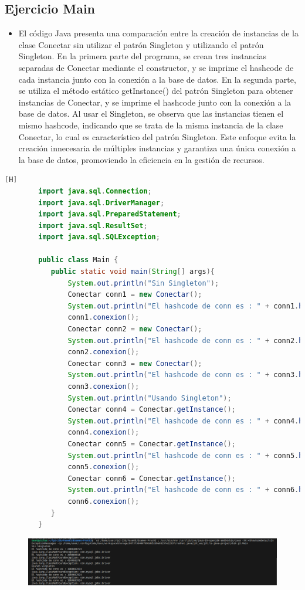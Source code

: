 \documentclass{article}
\begin{document}
	\subsection{Ejercicio Main}
	\begin{itemize}	
		\item El código Java presenta una comparación entre la creación de instancias de la clase Conectar sin utilizar el patrón Singleton y utilizando el patrón Singleton. En la primera parte del programa, se crean tres instancias separadas de Conectar mediante el constructor, y se imprime el hashcode de cada instancia junto con la conexión a la base de datos. En la segunda parte, se utiliza el método estático getInstance() del patrón Singleton para obtener instancias de Conectar, y se imprime el hashcode junto con la conexión a la base de datos. Al usar el Singleton, se observa que las instancias tienen el mismo hashcode, indicando que se trata de la misma instancia de la clase Conectar, lo cual es característico del patrón Singleton. Este enfoque evita la creación innecesaria de múltiples instancias y garantiza una única conexión a la base de datos, promoviendo la eficiencia en la gestión de recursos.
	\end{itemize}	
	\begin{lstlisting}[language=java,caption={Las lineas de codigos del metodo creado:}][H]
		import java.sql.Connection;
		import java.sql.DriverManager;
		import java.sql.PreparedStatement;
		import java.sql.ResultSet;
		import java.sql.SQLException;
		
		public class Main {
		   public static void main(String[] args){
			   System.out.println("Sin Singleton");
			   Conectar conn1 = new Conectar();
			   System.out.println("El hashcode de conn es : " + conn1.hashCode());
			   conn1.conexion();
			   Conectar conn2 = new Conectar();
			   System.out.println("El hashcode de conn es : " + conn2.hashCode());
			   conn2.conexion();
			   Conectar conn3 = new Conectar();
			   System.out.println("El hashcode de conn es : " + conn3.hashCode());
			   conn3.conexion();
			   System.out.println("Usando Singleton");
			   Conectar conn4 = Conectar.getInstance();
			   System.out.println("El hashcode de conn es : " + conn4.hashCode());
			   conn4.conexion();
			   Conectar conn5 = Conectar.getInstance();
			   System.out.println("El hashcode de conn es : " + conn5.hashCode());
			   conn5.conexion();
			   Conectar conn6 = Conectar.getInstance();
			   System.out.println("El hashcode de conn es : " + conn6.hashCode());
			   conn6.conexion();
		   }
		}
	\end{lstlisting}
	\begin{figure}[H]
		\centering
		\includegraphics[width=1.0\textwidth,keepaspectratio]{img/Screen.png}
	\end{figure}
\end{document}
